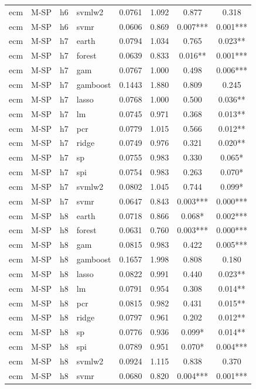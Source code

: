 \begin{ThreePartTable}
\begin{longtable}[t]{llclcccc}
ecm & M-SP & h6 & svmlw2 & 0.0761 & 1.092 & 0.877 & 0.318\\
ecm & M-SP & h6 & svmr & 0.0606 & 0.869 & 0.007*** & 0.001***\\
\addlinespace
ecm & M-SP & h7 & earth & 0.0794 & 1.034 & 0.765 & 0.023**\\
ecm & M-SP & h7 & forest & 0.0639 & 0.833 & 0.016** & 0.001***\\
ecm & M-SP & h7 & gam & 0.0767 & 1.000 & 0.498 & 0.006***\\
ecm & M-SP & h7 & gamboost & 0.1443 & 1.880 & 0.809 & 0.245\\
ecm & M-SP & h7 & lasso & 0.0768 & 1.000 & 0.500 & 0.036**\\
ecm & M-SP & h7 & lm & 0.0745 & 0.971 & 0.368 & 0.013**\\
ecm & M-SP & h7 & pcr & 0.0779 & 1.015 & 0.566 & 0.012**\\
ecm & M-SP & h7 & ridge & 0.0749 & 0.976 & 0.321 & 0.020**\\
ecm & M-SP & h7 & sp & 0.0755 & 0.983 & 0.330 & 0.065*\\
ecm & M-SP & h7 & spi & 0.0754 & 0.983 & 0.263 & 0.070*\\
ecm & M-SP & h7 & svmlw2 & 0.0802 & 1.045 & 0.744 & 0.099*\\
ecm & M-SP & h7 & svmr & 0.0647 & 0.843 & 0.003*** & 0.000***\\
\addlinespace
ecm & M-SP & h8 & earth & 0.0718 & 0.866 & 0.068* & 0.002***\\
ecm & M-SP & h8 & forest & 0.0631 & 0.760 & 0.003*** & 0.000***\\
ecm & M-SP & h8 & gam & 0.0815 & 0.983 & 0.422 & 0.005***\\
ecm & M-SP & h8 & gamboost & 0.1657 & 1.998 & 0.808 & 0.180\\
ecm & M-SP & h8 & lasso & 0.0822 & 0.991 & 0.440 & 0.023**\\
ecm & M-SP & h8 & lm & 0.0791 & 0.954 & 0.308 & 0.014**\\
ecm & M-SP & h8 & pcr & 0.0815 & 0.982 & 0.431 & 0.015**\\
ecm & M-SP & h8 & ridge & 0.0797 & 0.961 & 0.202 & 0.012**\\
ecm & M-SP & h8 & sp & 0.0776 & 0.936 & 0.099* & 0.014**\\
ecm & M-SP & h8 & spi & 0.0789 & 0.951 & 0.070* & 0.004***\\
ecm & M-SP & h8 & svmlw2 & 0.0924 & 1.115 & 0.838 & 0.370\\
ecm & M-SP & h8 & svmr & 0.0680 & 0.820 & 0.004*** & 0.001***\\

\end{longtable}
\end{ThreePartTable}
